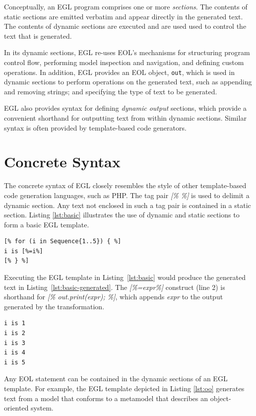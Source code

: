 Conceptually, an EGL program comprises one or more \emph{sections}. The contents of static sections are emitted verbatim and appear directly in the generated text. The contents of dynamic sections are executed and are used used to control the text that is generated.

In its dynamic sections, EGL re-uses EOL's mechanisms for structuring program control flow, performing model inspection and navigation, and defining custom operations. In addition, EGL provides an EOL object, \verb|out|, which is used in dynamic sections to perform operations on the generated text, such as appending and removing strings; and specifying the type of text to be generated.

EGL also provides syntax for defining \textit{dynamic output} sections, which provide a convenient shorthand for outputting text from within dynamic sections. Similar syntax is often provided by
template-based code generators.

\section{Concrete Syntax}
\label{concretesyntax}

The concrete syntax of EGL closely resembles the style of other template-based code generation languages, such as PHP. The tag pair \emph{[\% \%]} is used to delimit a dynamic section. Any text not enclosed in such a tag pair is contained in a static section. Listing \ref{lst:basic} illustrates the use of dynamic and static sections to form a basic EGL template.

\begin{lstlisting}[float=tbp, caption=A basic EGL template., label=lst:basic, language=EGL]
[% for (i in Sequence{1..5}) { %]
i is [%=i%]
[% } %]
\end{lstlisting}

Executing the EGL template in Listing~\ref{lst:basic} would produce the generated text in Listing~\ref{lst:basic-generated}. The \emph{[\%=expr\%]} construct (line 2) is shorthand for \emph{[\%
  out.print(expr); \%]}, which appends \emph{expr} to the output generated by the transformation.

\begin{lstlisting}[float=tbp, caption=The text generated from the basic EGL template (Listing~\ref{lst:basic})., label=lst:basic-generated]
i is 1
i is 2
i is 3
i is 4
i is 5
\end{lstlisting}

Any EOL statement can be contained in the dynamic sections of an EGL template. For example, the EGL template depicted in Listing \ref{lst:oo} generates text from a model that conforms to a metamodel that describes an object-oriented system. %

